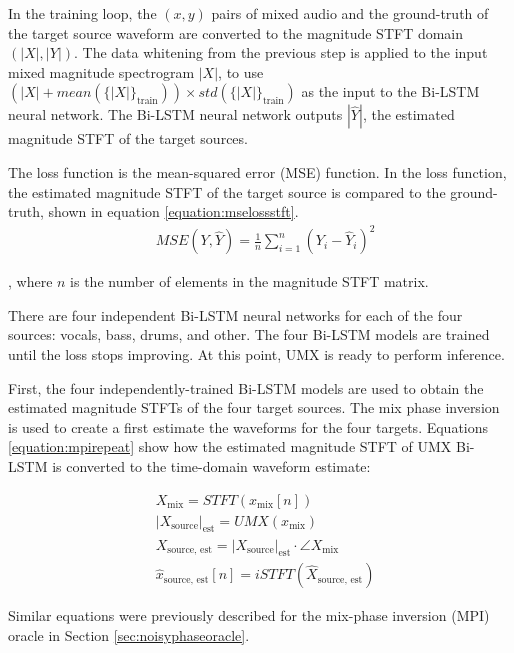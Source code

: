 \documentclass[report.tex]{subfiles}
\begin{document}
In the training loop, the $(x, y)$ pairs of mixed audio and the ground-truth of the target source waveform are converted to the magnitude STFT domain $(|X|, |Y|)$. The data whitening from the previous step is applied to the input mixed magnitude spectrogram $|X|$, to use $(|X|+\mathit{mean}(\{|X|\}_{\text{train}}))\times\mathit{std}(\{|X|\}_{\text{train}})$ as the input to the Bi-LSTM neural network. The Bi-LSTM neural network outputs $|\hat{Y}|$, the estimated magnitude STFT of the target sources.

The loss function is the mean-squared error (MSE) function. In the loss function, the estimated magnitude STFT of the target source is compared to the ground-truth, shown in equation \eqref{equation:mselossstft}.
\begin{align}\tag{31}\label{equation:mselossstft}
	\nonumber & \mathit{MSE}(Y, \hat{Y}) = \frac{1}{n} \sum_{i = 1}^{n}{(Y_{i}-\hat{Y}_{i})^{2}}
\end{align}

, where $n$ is the number of elements in the magnitude STFT matrix.

There are four independent Bi-LSTM neural networks for each of the four sources: vocals, bass, drums, and other. The four Bi-LSTM models are trained until the loss stops improving. At this point, UMX is ready to perform inference.

First, the four independently-trained Bi-LSTM models are used to obtain the estimated magnitude STFTs of the four target sources. The mix phase inversion is used to create a first estimate the waveforms for the four targets. Equations \eqref{equation:mpirepeat} show how the estimated magnitude STFT of UMX Bi-LSTM is converted to the time-domain waveform estimate:

\begin{align}\tag{32}\label{equation:mpirepeat}
	\nonumber & X_{\text{mix}} = \mathit{STFT}(x_{\text{mix}}[n])\\
	\nonumber & {|X_{\text{source}}|}_{\text{est}} = \mathit{UMX}(x_{\text{mix}})\\
	\nonumber & X_{\text{source, est}} = {|X_{\text{source}}|}_{\text{est}} \cdot \angle{X_{\text{mix}}}\\
	\nonumber & \hat{x}_{\text{source, est}}[n] = \mathit{iSTFT}(\hat{X}_{\text{source, est}})
\end{align}

Similar equations were previously described for the mix-phase inversion (MPI) oracle in Section \ref{sec:noisyphaseoracle}.
\end{document}
